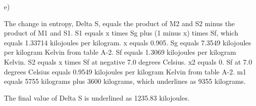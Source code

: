 e)

The change in entropy, Delta S, equals the product of M2 and S2 minus the product of M1 and S1. S1 equals x times Sg plus (1 minus x) times Sf, which equals 1.33714 kilojoules per kilogram. x equals 0.905. Sg equals 7.3549 kilojoules per kilogram Kelvin from table A-2. Sf equals 1.3069 kilojoules per kilogram Kelvin. S2 equals x times Sf at negative 7.0 degrees Celsius. x2 equals 0. Sf at 7.0 degrees Celsius equals 0.9549 kilojoules per kilogram Kelvin from table A-2. m1 equals 5755 kilograms plus 3600 kilograms, which underlines as 9355 kilograms.

The final value of Delta S is underlined as 1235.83 kilojoules.